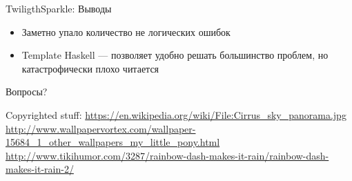 \documentclass[10pt]{beamer}
\begin{document}
\begin{frame}{TwiligthSparkle: Выводы}
  \begin{itemize}
    \item Заметно упало количество не логических ошибок
    \item Template Haskell — позволяет удобно решать большинство проблем, но
    катастрофически плохо читается
  \end{itemize}
\end{frame}

\begin{frame}
  \begin{center}
    \Large
    Вопросы?
  \end{center}
\end{frame}

\begin{frame}\label{lastframe}
  Copyrighted stuff:
  \footnotesize
  \url{https://en.wikipedia.org/wiki/File:Cirrus\_sky\_panorama.jpg} \\
  \url{http://www.wallpapervortex.com/wallpaper-15684\_1\_other\_wallpapers\_my\_little\_pony.html} \\
  \url{http://www.tikihumor.com/3287/rainbow-dash-makes-it-rain/rainbow-dash-makes-it-rain-2/}
\end{frame}
\end{document}
